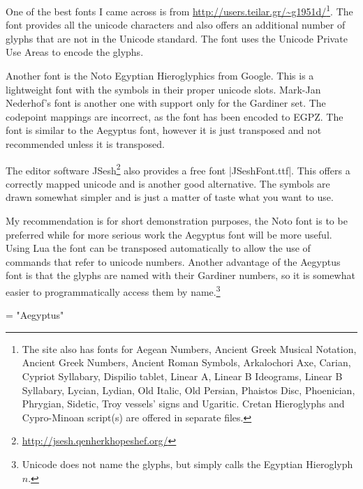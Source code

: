 One of the best fonts I came across is  from \url{http://users.teilar.gr/~g1951d/}\footnote{The site also has fonts for Aegean Numbers, Ancient Greek Musical Notation, Ancient Greek Numbers, Ancient Roman Symbols, Arkalochori Axe, Carian, Cypriot Syllabary, Dispilio tablet, Linear A, Linear B Ideograms, Linear B Syllabary, Lycian, Lydian, Old Italic, Old Persian, Phaistos Disc, Phoenician, Phrygian, Sidetic, Troy vessels’ signs and Ugaritic. Cretan Hieroglyphs and Cypro-Minoan script(s) are offered in separate files.}. The font provides all the unicode characters and also offers an additional number of glyphs that are not in the Unicode standard. The font uses the Unicode Private Use Areas to encode the glyphs. 

Another font is the Noto Egyptian Hieroglyphics from Google. This is a lightweight font with the symbols in their proper unicode slots. Mark-Jan Nederhof's  font is another one with support only for the Gardiner set. The codepoint mappings are incorrect, as the font has been  
encoded to EGPZ. The font is similar to the Aegyptus font, however it is just transposed and not recommended unless it is transposed. 

The editor software JSesh\footnote{\protect\url{http://jsesh.qenherkhopeshef.org/}} also provides a free font |JSeshFont.ttf|. This offers a correctly mapped unicode and is another good alternative. The symbols are drawn somewhat simpler and is just a matter of taste what you want to use.

My recommendation is for short demonstration purposes, the Noto font is to be preferred while for more serious work the Aegyptus font will be more useful. Using Lua the font can be transposed automatically to allow the use of commands that refer to unicode numbers. Another advantage of the Aegyptus font is that the glyphs are named with their Gardiner numbers, so it is somewhat easier to programmatically access them by name.\footnote{Unicode does not name the glyphs, but simply calls the Egyptian Hieroglyph $n$. } 

\medskip

\ifxetex
\bgroup
\centering 
\font\myfont = "Aegyptus"
\scalebox{7}{\myfont\XeTeXglyph 201}
\scalebox{7}{\myfont\XeTeXglyph 203}
\scalebox{7}{\myfont\XeTeXglyph 163}
\scalebox{7}{\myfont\XeTeXglyph 164}
\scalebox{7}{\myfont\XeTeXglyph 165}
\scalebox{7}{\myfont\XeTeXglyph 168}
\egroup
\fi

